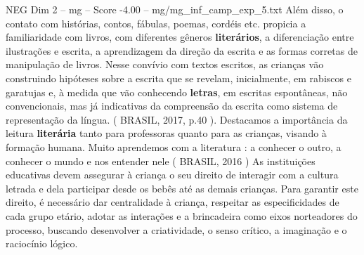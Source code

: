 \begin{textsample}{NEG Dim 2 – mg – Score -4.00 – mg/mg\_inf\_camp\_exp\_5.txt}
Além disso, o contato com histórias, contos, fábulas, poemas, cordéis etc. propicia a familiaridade com livros, com diferentes gêneros \textbf{literários}, a diferenciação entre ilustrações e escrita, a aprendizagem da direção da escrita e as formas corretas de manipulação de livros.
Nesse convívio com textos escritos, as crianças vão construindo hipóteses sobre a escrita que se revelam, inicialmente, em rabiscos e garatujas e, à medida que vão conhecendo \textbf{letras}, em escritas espontâneas, não convencionais, mas já indicativas da compreensão da escrita como sistema de representação da língua. ( BRASIL, 2017, p.40 ).
Destacamos a importância da leitura \textbf{literária} tanto para professoras quanto para as crianças, visando à formação humana.
Muito aprendemos com a literatura : a conhecer o outro, a conhecer o mundo e nos entender nele ( BRASIL, 2016 ) As instituições educativas devem assegurar à criança o seu direito de interagir com a cultura letrada e dela participar desde os bebês até as demais crianças.
Para garantir este direito, é necessário dar centralidade à criança, respeitar as especificidades de cada grupo etário, adotar as interações e a brincadeira como eixos norteadores do processo, buscando desenvolver a criatividade, o senso crítico, a imaginação e o raciocínio lógico.

\end{textsample}
